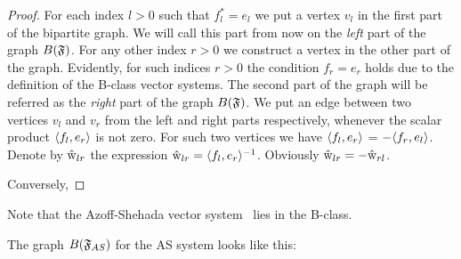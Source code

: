 \documentclass[12pt]{article}
\begin{document}
    \begin{proof}
      For each index $l > 0$ such that $f^*_l = e_l$ we put a vertex $v_l$ in the first part of the bipartite graph.
      We will call this part from now on the \emph{left} part of the graph $B(\mathfrak{F})$.
      For any other index $r > 0$ we construct a vertex in the other part of the graph.
      Evidently, for such indices $r > 0$ the condition $f_r = e_r$ holds due to the definition of the B-class vector systems.
      The second part of the graph will be referred as the \emph{right} part of the graph $B(\mathfrak{F})$.
      We put an edge between two vertices $v_l$ and $v_r$ from the left and right parts respectively,
      whenever the scalar product $\langle f_l, e_r \rangle$ is not zero.
      For such two vertices we have $\langle f_l, e_r \rangle$ = $-\langle f_r, e_l \rangle$.
      Denote by $\mathrm{\hat{w}}_{lr}$ the expression $\mathrm{\hat{w}}_{lr} = \langle f_l, e_r \rangle^{-1}$.
      Obviously $\mathrm{\hat{w}}_{lr} = -\mathrm{\hat{w}}_{rl}$.

      Conversely,
    \end{proof}
    \begin{remark}
      Note that the Azoff-Shehada vector system~\cite{azoff} lies in the B-class.
    \end{remark}
    \begin{example}
      The graph $B(\mathfrak{F}_{AS})$ for the AS system looks like this:
      \begin{center}
      \end{center}
    \end{example}
\end{document}

